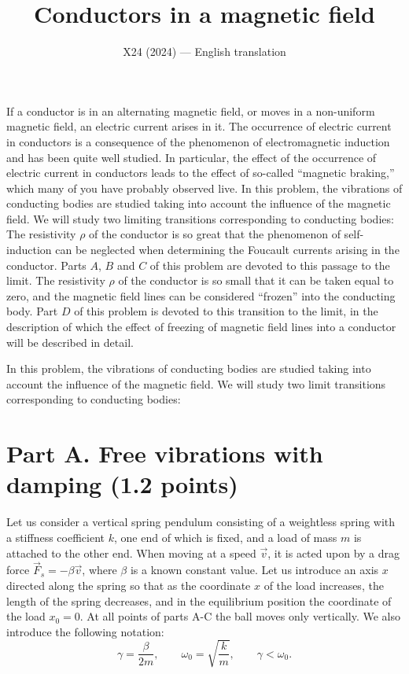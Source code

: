 \documentclass[11pt,a4paper]{article}
\title{\textbf{Conductors in a magnetic field}}
\author{\normalsize X24 (2024) --- English translation}
\date{}
\begin{document}
\maketitle

If a conductor is in an alternating magnetic field, or moves in a non-uniform magnetic field, an electric current arises in it. The occurrence of electric current in conductors is a consequence of the phenomenon of electromagnetic induction and has been quite well studied. In particular, the effect of the occurrence of electric current in conductors leads to the effect of so-called “magnetic braking,” which many of you have probably observed live. In this problem, the vibrations of conducting bodies are studied taking into account the influence of the magnetic field. We will study two limiting transitions corresponding to conducting bodies: The resistivity $\rho$ of the conductor is so great that the phenomenon of self-induction can be neglected when determining the Foucault currents arising in the conductor. Parts $A$, $B$ and $C$ of this problem are devoted to this passage to the limit. The resistivity $\rho$ of the conductor is so small that it can be taken equal to zero, and the magnetic field lines can be considered “frozen” into the conducting body. Part $D$ of this problem is devoted to this transition to the limit, in the description of which the effect of freezing of magnetic field lines into a conductor will be described in detail.

In this problem, the vibrations of conducting bodies are studied taking into account the influence of the magnetic field. We will study two limit transitions corresponding to conducting bodies:

\section*{Part A. Free vibrations with damping (1.2 points)}

Let us consider a vertical spring pendulum consisting of a weightless spring with a stiffness coefficient $k$, one end of which is fixed, and a load of mass $m$ is attached to the other end. When moving at a speed $\vec{v}$, it is acted upon by a drag force $\vec{F}_{s}=-\beta\vec{v}$, where $\beta$ is a known constant value. Let us introduce an axis $x$ directed along the spring so that as the coordinate $x$ of the load increases, the length of the spring decreases, and in the equilibrium position the coordinate of the load $x_0=0$. At all points of parts $\mathrm{A}$-$\mathrm{C}$ the ball moves only vertically. We also introduce the following notation:
$$\gamma=\frac{\beta}{2m},\qquad \omega_0=\sqrt{\frac{k}{m}},\qquad \gamma<\omega_0.$$
\end{document}
